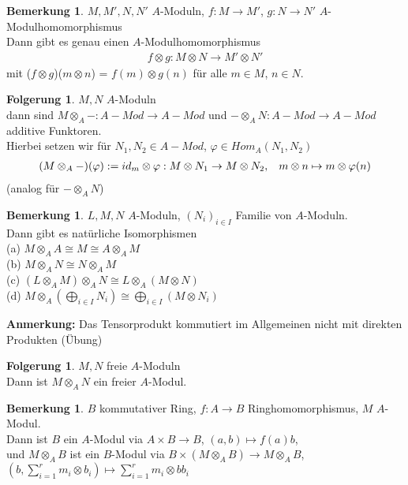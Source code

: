\documentclass[10pt,a4paper,numbers=endperiod]{scrreprt}
\theoremstyle{definition}
\newtheorem{bem}[satz]{Bemerkung}
\newtheorem{folg}[satz]{Folgerung}
\begin{document}
\begin{bem}
	$M, M', N, N'$ $A$-Moduln, $f: M \to M'$, $g: N \to N'$ $A$-Modulhomomorphismus\\
	Dann gibt es genau einen $A$-Modulhomomorphismus \begin{align*}
		f \otimes g: M \otimes N \to M' \otimes N'
	\end{align*}
	mit ($f \otimes g$)($m \otimes n$) = $f(m) \otimes g(n)$ für alle $m \in M$, $n \in N$.
\end{bem}

\begin{folg}
	$M, N$ $A$-Moduln\\
	dann sind $M \otimes_A -: A-Mod \to A-Mod$ und $- \otimes_A N: A-Mod \to A-Mod$ additive Funktoren.\\
	Hierbei setzen wir für $N_1, N_2 \in A-Mod$, $\varphi \in Hom_A(N_1, N_2)$ \begin{align*}
		(M \otimes_A -)(\varphi) := id_m \otimes \varphi: M \otimes N_1 \to M \otimes N_2, \hspace*{3mm} m \otimes n \mapsto m \otimes \varphi(n)
	\end{align*}
	(analog für $- \otimes_A N$)
\end{folg}

\begin{bem}
	$L, M, N$ $A$-Moduln, $(N_i)_{i \in I}$ Familie von $A$-Moduln.\\
	Dann gibt es natürliche Isomorphismen\\
	(a) $M \otimes_A A \cong M \cong A \otimes_A M$\\
	(b) $M \otimes_A N \cong N \otimes_A M$\\
	(c) $(L \otimes_A M) \otimes_A N \cong L \otimes_A (M \otimes N)$\\
	(d) $M \otimes_A( \bigoplus\limits_{i \in I} N_i) \cong \bigoplus\limits_{i \in I} (M \otimes N_i)$
\end{bem}

\textbf{Anmerkung:} Das Tensorprodukt kommutiert im Allgemeinen nicht mit direkten Produkten (Übung)

\begin{folg}
	$M, N$ freie $A$-Moduln\\
	Dann ist $M \otimes_A N$ ein freier $A$-Modul.
\end{folg}

\begin{bem}
	$B$ kommutativer Ring, $f: A \to B$ Ringhomomorphismus, $M$ $A$-Modul.\\
	Dann ist $B$ ein $A$-Modul via $A \times B \to B$, $(a,b) \mapsto f(a)b$,\\
	und $M \otimes_A B$ ist ein $B$-Modul via $B \times (M \otimes_A B) \to M \otimes_A B$, $(b, \sum\limits_{i = 1}^r m_i \otimes b_i) \mapsto \sum\limits_{i = 1}^r m_i \otimes b b_i$
\end{bem}
\end{document}
